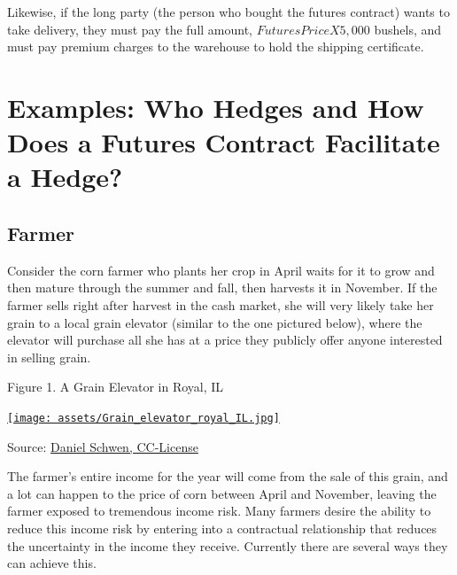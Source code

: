 \documentclass[
  letterpaper,
  DIV=11,
  numbers=noendperiod]{scrreprt}
\begin{document}
Likewise, if the long party (the person who bought the futures contract)
wants to take delivery, they must pay the full amount,
\(Futures Price X 5,000\) bushels, and must pay premium charges to the
warehouse to hold the shipping certificate.

\section{Examples: Who Hedges and How Does a Futures Contract Facilitate
a
Hedge?}\label{examples-who-hedges-and-how-does-a-futures-contract-facilitate-a-hedge}

\subsection{Farmer}\label{farmer}

Consider the corn farmer who plants her crop in April waits for it to
grow and then mature through the summer and fall, then harvests it in
November. If the farmer sells right after harvest in the cash market,
she will very likely take her grain to a local grain elevator (similar
to the one pictured below), where the elevator will purchase all she has
at a price they publicly offer anyone interested in selling grain.

Figure 1. A Grain Elevator in Royal, IL

\href{https://commons.wikimedia.org/wiki/File:Grain_elevators_in_Royal,_IL.}{\texttt{[image: assets/Grain\_elevator\_royal\_IL.jpg]}}

Source:
\href{https://commons.wikimedia.org/wiki/File\%3AGrain_elevators_in_Royal\%2C_IL.jpg}{Daniel
Schwen, CC-License}

The farmer's entire income for the year will come from the sale of this
grain, and a lot can happen to the price of corn between April and
November, leaving the farmer exposed to tremendous income risk. Many
farmers desire the ability to reduce this income risk by entering into a
contractual relationship that reduces the uncertainty in the income they
receive. Currently there are several ways they can achieve this.
\end{document}
